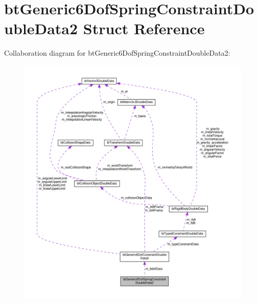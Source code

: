 \hypertarget{structbtGeneric6DofSpringConstraintDoubleData2}{}\section{bt\+Generic6\+Dof\+Spring\+Constraint\+Double\+Data2 Struct Reference}
\label{structbtGeneric6DofSpringConstraintDoubleData2}


Collaboration diagram for bt\+Generic6\+Dof\+Spring\+Constraint\+Double\+Data2\+:
\nopagebreak
\begin{figure}[H]
\begin{center}
\leavevmode
\includegraphics[width=350pt]{structbtGeneric6DofSpringConstraintDoubleData2__coll__graph}
\end{center}
\end{figure}
